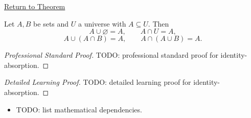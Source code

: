 \newpage
{}
\label{prf:identity-absorption}

\begin{remark*}[Return]
\hyperref[thm:identity-absorption]{Return to Theorem}
\end{remark*}

\begin{theorem*}
Let $A,B$ be sets and $U$ a universe with $A \subseteq U$. Then
\[
A \cup \varnothing = A,
\qquad
A \cap U = A,
\]
\[
A \cup (A \cap B) = A,
\qquad
A \cap (A \cup B) = A.
\]
\end{theorem*}

\begin{proof}[Professional Standard Proof]
\LRAProofBodyStart
TODO: professional standard proof for identity-absorption.
\end{proof}

\begin{proof}[Detailed Learning Proof]
\LRAProofBodyStart
TODO: detailed learning proof for identity-absorption.
\end{proof}

\begin{remark*}
\end{remark*}

\begin{dependencies}
\begin{itemize}
  \item TODO: list mathematical dependencies.
\end{itemize}
\end{dependencies}

\clearpage
